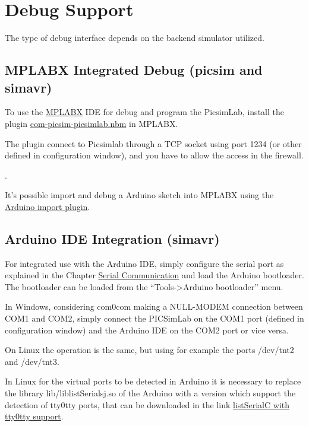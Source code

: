 \chapter{Debug Support}

The type of debug interface depends on the backend simulator utilized.


\section{MPLABX Integrated Debug (picsim and simavr) } \hypertarget{def:mplabxd}{}

To use the \href{http://www.microchip.com/mplabx}{MPLABX} IDE for debug and program the PicsimLab, install the plugin \href{https://github.com/lcgamboa/picsimlab_md/releases/}{com-picsim-picsimlab.nbm} in MPLABX.

The plugin connect to Picsimlab through a TCP socket using port 1234 (or other defined in configuration window), and you have to allow the access in the firewall.

.

It's possible import and debug a Arduino sketch into MPLABX using the \href{https://github.com/janegilruud/chipKIT-importer-2.0}{Arduino import plugin}.

\section{Arduino IDE Integration (simavr) }

For integrated use with the Arduino IDE, simply configure the serial port as explained in the Chapter \hyperlink{def:seriali}{Serial Communication} and load the Arduino bootloader. The bootloader can be loaded from the ``Tools->Arduino bootloader'' menu.

In Windows, considering com0com making a NULL-MODEM connection between COM1 and COM2, simply connect the PICSimLab on the COM1 port (defined in configuration window) and the Arduino IDE on the COM2 port or vice versa.

On Linux the operation is the same, but using for example the ports /dev/tnt2 and /dev/tnt3.

In Linux for the virtual ports to be detected in Arduino it is necessary to replace the library lib/liblistSerialsj.so of the Arduino with a version which support the detection of tty0tty ports, that can be downloaded in the link \href{https://github.com/lcgamboa/listSerialPortsC/releases} {listSerialC with tty0tty support}.


